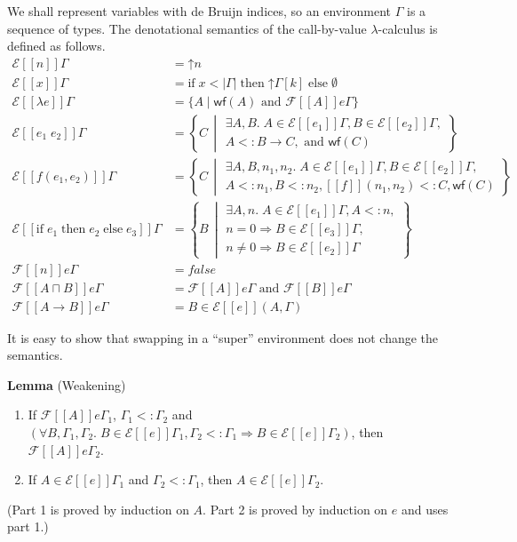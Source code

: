 \documentclass{article}
\newcommand{\app}[0]{\;}
\newcommand{\IF}[0]{\mathrm{if}\;}
\newcommand{\THEN}[0]{\;\mathrm{then}\;}
\newcommand{\ELSE}[0]{\;\mathrm{else}\;}
\newcommand{\SEM}[1]{[\![ #1 ]\!]}
\newcommand{\ESEM}[1]{\mathcal{E}\SEM{#1}}
\newcommand{\FSEM}[1]{\mathcal{F}\SEM{#1}}
\newcommand{\WF}[1]{\mathsf{wf}(#1)}
\newcommand{\UP}[1]{\mathord{\uparrow} #1}
\begin{document}
We shall represent variables with de Bruijn indices, so an environment
$\Gamma$ is a sequence of types.  The denotational semantics of the
call-by-value $\lambda$-calculus is defined as follows.
\begin{align*}
  \ESEM{n}\Gamma &= \UP{n} \\
  \ESEM{x}\Gamma &=  \IF x < |\Gamma| \THEN \UP{\Gamma[k]} \ELSE \emptyset \\
  \ESEM{\lambda e }\Gamma &= \{ A \mid \WF{A} \text{ and } \FSEM{A}e\Gamma \} \\
  \ESEM{e_1\app e_2}\Gamma &= \left\{ C\, \middle| 
      \begin{array}{l}
      \exists A,B.\; A \in \ESEM{e_1}\Gamma,
      B \in \ESEM{e_2}\Gamma,\\
      A <: B \to C, \text{ and } \WF{C}
      \end{array}
        \right\} \\
  \ESEM{f(e_1,e_2)}\Gamma &=
      \left\{ C\, \middle| \begin{array}{l}
       \exists A,B,n_1,n_2.\; A \in \ESEM{e_1}\Gamma, B \in \ESEM{e_2}\Gamma,\\
      A <: n_1, B <: n_2, \SEM{f}(n_1,n_2) <: C, \WF{C} 
      \end{array} \right\} \\
  \ESEM{\IF e_1 \THEN e_2 \ELSE e_3}\Gamma &=
    \left\{ B\, \middle| 
    \begin{array}{l}\exists A, n.\; A \in \ESEM{e_1}\Gamma, A <: n,\\
           n = 0 \Rightarrow B \in \ESEM{e_3}\Gamma,\\
           n \neq 0 \Rightarrow B \in \ESEM{e_2}\Gamma
    \end{array}
    \right\}
    \\[2ex]
   \FSEM{n}e\Gamma &= \mathit{false} \\
   \FSEM{A \sqcap B}e \Gamma &= \FSEM{A}e\Gamma \text{ and } \FSEM{B}e\Gamma\\
   \FSEM{A \to B}e \Gamma &= B \in \ESEM{e} (A, \Gamma)
\end{align*}

It is easy to show that swapping in a ``super'' environment does not
change the semantics.

\noindent \textbf{Lemma} (Weakening)
\begin{enumerate}
\item If $\FSEM{A}e \Gamma_1$, $\Gamma_1 <: \Gamma_2$ and
  $(\forall B, \Gamma_1, \Gamma_2.\;
     B \in \ESEM{e}\Gamma_1, \Gamma_2 <: \Gamma_1
    \Rightarrow B \in \ESEM{e}\Gamma_2)$, then
  $\FSEM{A}e \Gamma_2$.
\item If $A \in \ESEM{e}\Gamma_1$ and $\Gamma_2 <: \Gamma_1$,
  then $A \in \ESEM{e}\Gamma_2$.
\end{enumerate}
(Part 1 is proved by induction on $A$. Part 2 is proved by induction
on $e$ and uses part 1.) \\
\end{document}
